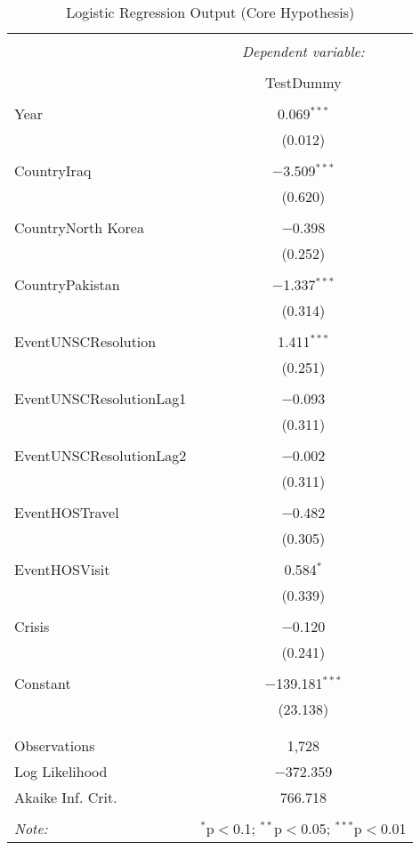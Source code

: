 
\begin{table}[!htbp] \centering 
  \caption{Logistic Regression Output (Core Hypothesis)} 
  \label{} 
\begin{tabular}{@{\extracolsep{5pt}}lc} 
\\[-1.8ex]\hline 
\hline \\[-1.8ex] 
 & \multicolumn{1}{c}{\textit{Dependent variable:}} \\ 
\cline{2-2} 
\\[-1.8ex] & TestDummy \\ 
\hline \\[-1.8ex] 
 Year & 0.069$^{***}$ \\ 
  & (0.012) \\ 
  & \\ 
 CountryIraq & $-$3.509$^{***}$ \\ 
  & (0.620) \\ 
  & \\ 
 CountryNorth Korea & $-$0.398 \\ 
  & (0.252) \\ 
  & \\ 
 CountryPakistan & $-$1.337$^{***}$ \\ 
  & (0.314) \\ 
  & \\ 
 EventUNSCResolution & 1.411$^{***}$ \\ 
  & (0.251) \\ 
  & \\ 
 EventUNSCResolutionLag1 & $-$0.093 \\ 
  & (0.311) \\ 
  & \\ 
 EventUNSCResolutionLag2 & $-$0.002 \\ 
  & (0.311) \\ 
  & \\ 
 EventHOSTravel & $-$0.482 \\ 
  & (0.305) \\ 
  & \\ 
 EventHOSVisit & 0.584$^{*}$ \\ 
  & (0.339) \\ 
  & \\ 
 Crisis & $-$0.120 \\ 
  & (0.241) \\ 
  & \\ 
 Constant & $-$139.181$^{***}$ \\ 
  & (23.138) \\ 
  & \\ 
\hline \\[-1.8ex] 
Observations & 1,728 \\ 
Log Likelihood & $-$372.359 \\ 
Akaike Inf. Crit. & 766.718 \\ 
\hline 
\hline \\[-1.8ex] 
\textit{Note:}  & \multicolumn{1}{r}{$^{*}$p$<$0.1; $^{**}$p$<$0.05; $^{***}$p$<$0.01} \\ 
\end{tabular} 
\end{table} 
